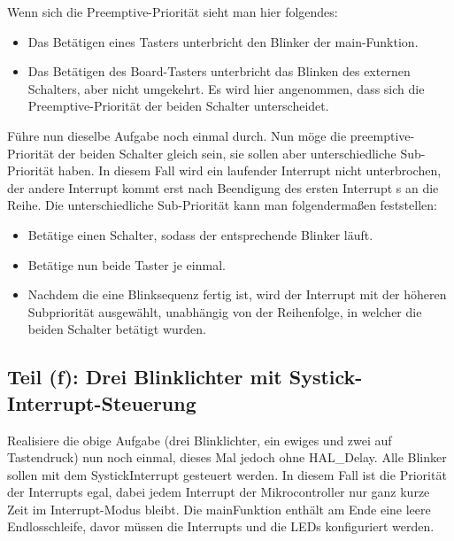 Wenn sich die Preemptive-Priorität sieht man hier folgendes:
\begin{itemize}
	\item Das Betätigen eines Tasters unterbricht den Blinker der main-Funktion.
	\item Das Betätigen des Board-Tasters unterbricht das Blinken des externen Schalters, aber
	nicht umgekehrt. Es wird hier angenommen, dass sich die Preemptive-Priorität der
	beiden Schalter unterscheidet.
\end{itemize} 
Führe nun dieselbe Aufgabe noch einmal durch. Nun möge die preemptive-Priorität der
beiden Schalter gleich sein, sie sollen aber unterschiedliche Sub-Priorität haben. In diesem
Fall wird ein laufender Interrupt nicht unterbrochen, der andere Interrupt kommt erst nach
Beendigung des ersten Interrupt s an die Reihe. Die unterschiedliche Sub-Priorität kann man
folgendermaßen feststellen:
\begin{itemize}
	\item Betätige einen Schalter, sodass der entsprechende Blinker läuft.
	\item Betätige nun beide Taster je einmal.
	\item Nachdem die eine Blinksequenz fertig ist, wird der Interrupt mit der höheren Subpriorität
	ausgewählt, unabhängig von der Reihenfolge, in welcher die beiden Schalter betätigt
	wurden.
\end{itemize}
\subsection{Teil (f): Drei Blinklichter mit Systick-Interrupt-Steuerung}
Realisiere die obige Aufgabe (drei Blinklichter, ein ewiges und zwei auf Tastendruck) nun
noch einmal, dieses Mal jedoch ohne HAL\_Delay. Alle Blinker sollen mit dem SystickInterrupt
gesteuert werden. In diesem Fall ist die Priorität der Interrupts egal, dabei jedem
Interrupt der Mikrocontroller nur ganz kurze Zeit im Interrupt-Modus bleibt. Die mainFunktion
enthält am Ende eine leere Endlosschleife, davor müssen die Interrupts und die
LEDs konfiguriert werden.
\clearpage
